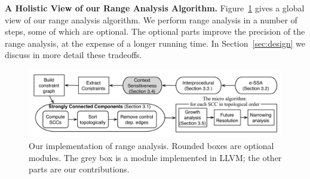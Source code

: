 \documentclass{llncs}
\begin{document}
\noindent
\textbf{A Holistic View of our Range Analysis Algorithm.}
Figure~\ref{fig:algorithm} gives a global view of our range analysis
algorithm.
We perform range analysis in a number of steps, some of which are optional.
The optional parts improve the precision of the range analysis, at the expense of
a longer running time.
In Section~\ref{sec:design} we discuss in more detail these tradeoffs.

\begin{figure}[t!]
\begin{center}
\includegraphics[width=\textwidth]{images/algorithm}
\end{center}
\caption{\label{fig:algorithm}
Our implementation of range analysis. Rounded boxes are optional modules.
The grey box is a module implemented in LLVM; the other parts are our
contributions.}
\end{figure}
\end{document}
